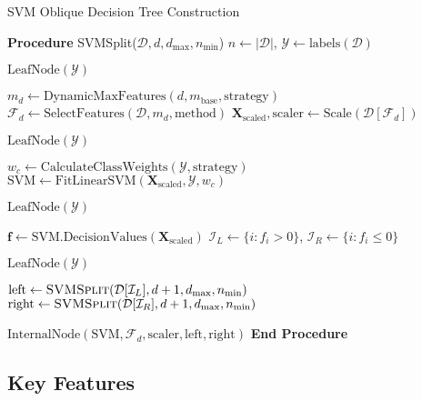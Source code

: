 \begin{algorithm}
\caption{SVM Oblique Decision Tree Construction}
\label{alg:svmodt}
\begin{algorithmic}[1]
\STATE \textbf{Procedure} SVMSplit($\mathcal{D}, d, d_{\max}, n_{\min}$)
    \STATE $n \gets |\mathcal{D}|$, $\mathcal{Y} \gets \text{labels}(\mathcal{D})$
    
        \RETURN $\text{LeafNode}(\mathcal{Y})$ 
    \ENDIF
    
    \STATE $m_d \gets \text{DynamicMaxFeatures}(d, m_{\text{base}}, \text{strategy})$
    \STATE $\mathcal{F}_d \gets \text{SelectFeatures}(\mathcal{D}, m_d, \text{method})$
    \STATE $\mathbf{X}_{\text{scaled}}, \text{scaler} \gets \text{Scale}(\mathcal{D}[\mathcal{F}_d])$
    
        \RETURN $\text{LeafNode}(\mathcal{Y})$ 
    \ENDIF
    
    \STATE $w_c \gets \text{CalculateClassWeights}(\mathcal{Y}, \text{strategy})$
    \STATE $\text{SVM} \gets \text{FitLinearSVM}(\mathbf{X}_{\text{scaled}}, \mathcal{Y}, w_c)$
    
        \RETURN $\text{LeafNode}(\mathcal{Y})$ 
    \ENDIF
    
    \STATE $\mathbf{f} \gets \text{SVM.DecisionValues}(\mathbf{X}_{\text{scaled}})$
    \STATE $\mathcal{I}_L \gets \{i : f_i > 0\}$, $\mathcal{I}_R \gets \{i : f_i \leq 0\}$
    
        \RETURN $\text{LeafNode}(\mathcal{Y})$ 
    \ENDIF
    
    \STATE $\text{left} \gets \textsc{SVMSplit}(\mathcal{D}[\mathcal{I}_L], d+1, d_{\max}, n_{\min})$
    \STATE $\text{right} \gets \textsc{SVMSplit}(\mathcal{D}[\mathcal{I}_R], d+1, d_{\max}, n_{\min})$
    
    \RETURN $\text{InternalNode}(\text{SVM}, \mathcal{F}_d, \text{scaler}, \text{left}, \text{right})$
\STATE \textbf{End Procedure}
\end{algorithmic}
\end{algorithm}

\subsection{Key Features}\label{key-features}

